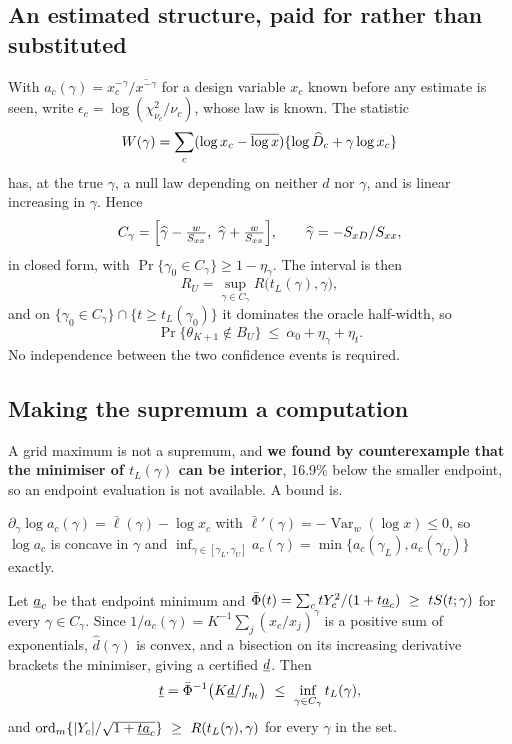 \subsection{An estimated structure, paid for rather than substituted}

With $a_c(\gamma)=x_c^{-\gamma}/\overline{x^{-\gamma}}$ for a design variable
$x_c$ known before any estimate is seen, write
$\epsilon_c=\log(\chi^2_{\nu_c}/\nu_c)$, whose law is known. The statistic
\[
W(\gamma)=\sum_c(\log x_c-\overline{\log x})\{\log\widehat D_c+\gamma\log x_c\}
\]
has, at the true $\gamma$, a null law depending on neither $d$ nor $\gamma$, and
is linear increasing in $\gamma$. Hence
\begin{equation}\label{eq:Cgamma}
C_\gamma=\Big[\widehat\gamma-\tfrac{w}{S_{xx}},\ \widehat\gamma+\tfrac{w}{S_{xx}}\Big],
\qquad \widehat\gamma=-S_{xD}/S_{xx},
\end{equation}
in closed form, with $\Pr\{\gamma_0\in C_\gamma\}\ge1-\eta_\gamma$. The interval
is then
\[
R_U=\sup_{\gamma\in C_\gamma}R\big(t_L(\gamma),\gamma\big),
\]
and on $\{\gamma_0\in C_\gamma\}\cap\{t\ge t_L(\gamma_0)\}$ it dominates the
oracle half-width, so
\begin{equation}\label{eq:guarantee}
\Pr\{\theta_{K+1}\notin B_U\}\ \le\ \alpha_0+\eta_\gamma+\eta_t .
\end{equation}
No independence between the two confidence events is required.

\subsection{Making the supremum a computation}

A grid maximum is not a supremum, and \textbf{we found by counterexample that the
minimiser of $t_L(\gamma)$ can be interior}, 16.9\% below the smaller endpoint,
so an endpoint evaluation is not available. A bound is.

\begin{lemma}\label{lem:concave}
$\partial_\gamma\log a_c(\gamma)=\bar\ell(\gamma)-\log x_c$ with
$\bar\ell'(\gamma)=-\operatorname{Var}_w(\log x)\le0$, so $\log a_c$ is concave in
$\gamma$ and
$\inf_{\gamma\in[\gamma_L,\gamma_U]}a_c(\gamma)=\min\{a_c(\gamma_L),a_c(\gamma_U)\}$
exactly.
\end{lemma}

\begin{proposition}\label{prop:cert}
Let $\underline a_c$ be that endpoint minimum and
$\bar\Phi(t)=\sum_ctY_c^2/(1+t\alo_c)\ \ge\ tS(t;\gamma)$ for every
$\gamma\in C_\gamma$. Since $1/a_c(\gamma)=K^{-1}\sum_j(x_c/x_j)^\gamma$ is a
positive sum of exponentials, $\widehat d(\gamma)$ is convex, and a bisection on
its increasing derivative brackets the minimiser, giving a certified $\underline d$.
Then
\[
\tlo=\bar\Phi^{-1}\big(K\dlo/f_{\eta_t}\big)\ \le\ \inf_{\gamma\in C_\gamma}t_L(\gamma),
\]
and $\operatorname{ord}_m\{|Y_c|/\sqrt{1+\tlo\alo_c}\}\ \ge\
R(t_L(\gamma),\gamma)$ for every $\gamma$ in the set.
\end{proposition}

